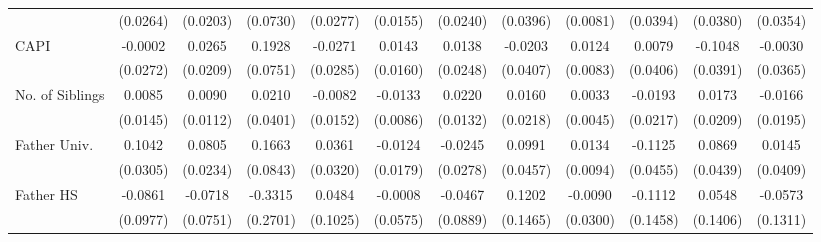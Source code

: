 \begin{table}[htbp]
\begin{tabular}{l*{11}{c}}
            &    (0.0264)         &    (0.0203)         &    (0.0730)         &    (0.0277)         &    (0.0155)         &    (0.0240)         &    (0.0396)         &    (0.0081)         &    (0.0394)         &    (0.0380)         &    (0.0354)         \\
\addlinespace
CAPI        &     -0.0002         &      0.0265         &      0.1928\sym{*}  &     -0.0271         &      0.0143         &      0.0138         &     -0.0203         &      0.0124         &      0.0079         &     -0.1048\sym{**} &     -0.0030         \\
            &    (0.0272)         &    (0.0209)         &    (0.0751)         &    (0.0285)         &    (0.0160)         &    (0.0248)         &    (0.0407)         &    (0.0083)         &    (0.0406)         &    (0.0391)         &    (0.0365)         \\
\addlinespace
No. of Siblings&      0.0085         &      0.0090         &      0.0210         &     -0.0082         &     -0.0133         &      0.0220         &      0.0160         &      0.0033         &     -0.0193         &      0.0173         &     -0.0166         \\
            &    (0.0145)         &    (0.0112)         &    (0.0401)         &    (0.0152)         &    (0.0086)         &    (0.0132)         &    (0.0218)         &    (0.0045)         &    (0.0217)         &    (0.0209)         &    (0.0195)         \\
\addlinespace
Father Univ.&      0.1042\sym{***}&      0.0805\sym{***}&      0.1663\sym{*}  &      0.0361         &     -0.0124         &     -0.0245         &      0.0991\sym{*}  &      0.0134         &     -0.1125\sym{*}  &      0.0869\sym{*}  &      0.0145         \\
            &    (0.0305)         &    (0.0234)         &    (0.0843)         &    (0.0320)         &    (0.0179)         &    (0.0278)         &    (0.0457)         &    (0.0094)         &    (0.0455)         &    (0.0439)         &    (0.0409)         \\
\addlinespace
Father HS   &     -0.0861         &     -0.0718         &     -0.3315         &      0.0484         &     -0.0008         &     -0.0467         &      0.1202         &     -0.0090         &     -0.1112         &      0.0548         &     -0.0573         \\
            &    (0.0977)         &    (0.0751)         &    (0.2701)         &    (0.1025)         &    (0.0575)         &    (0.0889)         &    (0.1465)         &    (0.0300)         &    (0.1458)         &    (0.1406)         &    (0.1311)         \\

\end{tabular}
\end{table}
